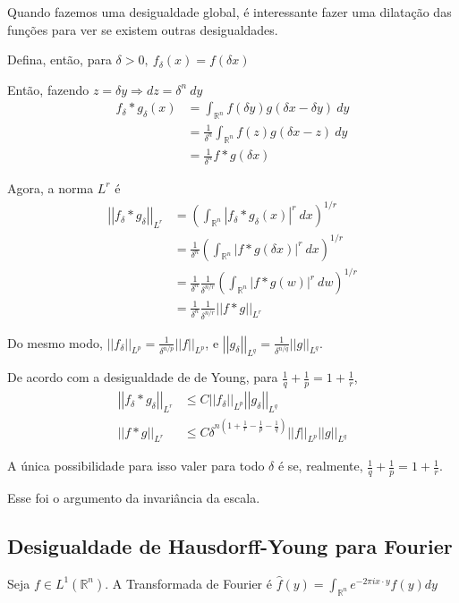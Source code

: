 \documentclass[11pt]{article}
\newcommand{\Rn}{{\mathbb{R}^n}}
\newcommand{\dd}{\delta}
\newcommand{\norm}[2]{\left|\left|#1\right|\right|_{L^{#2}}}
\begin{document}
Quando fazemos uma desigualdade global, é interessante fazer uma dilatação das funções para ver se existem outras desigualdades.

Defina, então, para \( \delta>0, \ f_\delta (x) = f(\delta x)\)

Então, fazendo \( z = \dd y \Rightarrow dz = \dd^n\ dy \)\begin{align*}
	f_\dd * g_\dd (x) &= \int_\Rn f(\dd y)g(\dd x - \dd y)\ dy \\
	&= \frac{1}{\dd^n} \int_\Rn f(z)g(\dd x - z)\ dy \\
	&= \frac{1}{\dd^n} f * g(\delta x)
\end{align*}

Agora, a norma \( L^r \) é \begin{align*}
	\norm{f_\dd*g_\dd}{r} &= \left( \int_\Rn | f_\dd * g_\dd (x) |^r \ dx  \right)^{1/r} \\
	&= \frac{1}{\dd^n} \left( \int_\Rn | f * g (\dd x) |^r \ dx \right)^{1/r} \\
	&= \frac{1}{\dd^n}\frac{1}{\dd^{n/r}} \left( \int_\Rn | f * g (w) |^r \ dw \right)^{1/r} \\
	&= \frac{1}{\dd^n}\frac{1}{\dd^{n/r}} \norm{f*g}{r}
\end{align*}

Do mesmo modo, \( \norm{f_\dd}{p} = \frac{1}{\dd^{n/p}}  \norm{f}{p}\), e \( \norm{g_\dd}{q} = \frac{1}{\dd^{n/q}} \norm{g}{q} \).

De acordo com a desigualdade de de Young, para \( \frac{1}{q} + \frac{1}{p} = 1 + \frac{1}{r} \), 
\begin{align*}
	\norm{f_\dd * g_\dd}{r} &\leq C \norm{f_\dd}{p} \norm{g_\dd}{q}\\
	\norm{f * g}{r} &\leq C \dd^{n \left( 1 + \frac{1}{r} - \frac{1}{p} - \frac{1}{q}\right) } \norm{f}{p} \norm{g}{q}
\end{align*}

A única possibilidade para isso valer para todo \( \delta \) é se, realmente, \( \frac{1}{q} + \frac{1}{p} = 1 + \frac{1}{r} \). 

Esse foi o argumento da invariância da escala.

\subsection{Desigualdade de Hausdorff-Young para Fourier}

Seja \( f \in L^1 (\Rn) \). A Transformada de Fourier é \(\hat{f}(y) = \int_\Rn e^{-2\pi i x \cdot y} f(y) dy\)
\end{document}
